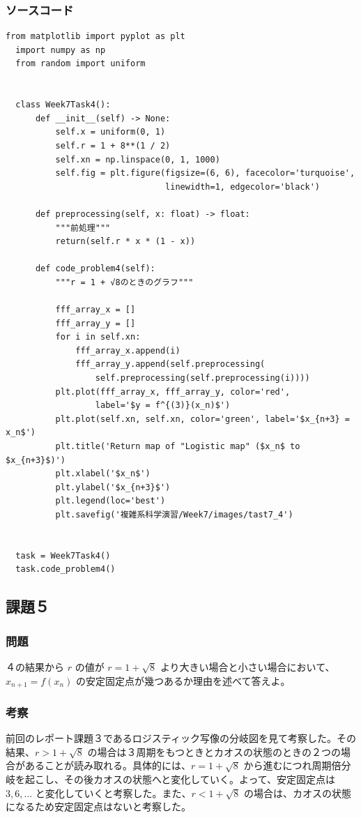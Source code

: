 \subsubsection{ソースコード}
\begin{lstlisting}[caption=task7-4.py]
  from matplotlib import pyplot as plt
  import numpy as np
  from random import uniform


  class Week7Task4():
      def __init__(self) -> None:
          self.x = uniform(0, 1)
          self.r = 1 + 8**(1 / 2)
          self.xn = np.linspace(0, 1, 1000)
          self.fig = plt.figure(figsize=(6, 6), facecolor='turquoise',
                                linewidth=1, edgecolor='black')

      def preprocessing(self, x: float) -> float:
          """前処理"""
          return(self.r * x * (1 - x))

      def code_problem4(self):
          """r = 1 + √8のときのグラフ"""

          fff_array_x = []
          fff_array_y = []
          for i in self.xn:
              fff_array_x.append(i)
              fff_array_y.append(self.preprocessing(
                  self.preprocessing(self.preprocessing(i))))
          plt.plot(fff_array_x, fff_array_y, color='red',
                  label='$y = f^{(3)}(x_n)$')
          plt.plot(self.xn, self.xn, color='green', label='$x_{n+3} = x_n$')
          plt.title('Return map of "Logistic map" ($x_n$ to $x_{n+3}$)')
          plt.xlabel('$x_n$')
          plt.ylabel('$x_{n+3}$')
          plt.legend(loc='best')
          plt.savefig('複雑系科学演習/Week7/images/tast7_4')


  task = Week7Task4()
  task.code_problem4()
\end{lstlisting}

\subsection{課題５}
\subsubsection{問題}
４の結果から $r$ の値が $r = 1 + \sqrt{8}$ より大きい場合と小さい場合において、$x_{n+1} = f \left( x_n \right)$ の安定固定点が幾つあるか理由を述べて答えよ。
\subsubsection{考察}
前回のレポート課題３であるロジスティック写像の分岐図を見て考察した。その結果、$r > 1 + \sqrt{8}$ の場合は３周期をもつときとカオスの状態のときの２つの場合があることが読み取れる。具体的には、$r = 1 + \sqrt{8}$ から進むにつれ周期倍分岐を起こし、その後カオスの状態へと変化していく。よって、安定固定点は$3, 6, ...$ と変化していくと考察した。また、$r < 1 + \sqrt{8}$ の場合は、カオスの状態になるため安定固定点はないと考察した。


